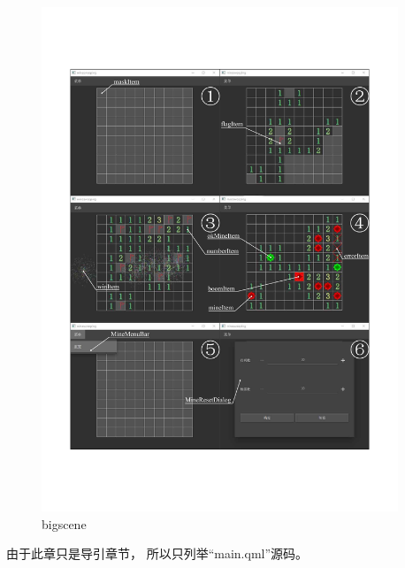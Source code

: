 \begin{figure}[htb] %
\marginnote{\setlength\fboxsep{2pt}\fbox{\footnotesize{\kaishu\figurename\,}\footnotesize{\ref{p000065}}}}\centering %
\includegraphics[width=0.95\textwidth]{chapter01/images/minesweeping_app.pdf} %
\caption{bigscene} %
\label{p000065} %
\end{figure}


由于此章只是导引章节，
所以只列举“main.qml”源码。

